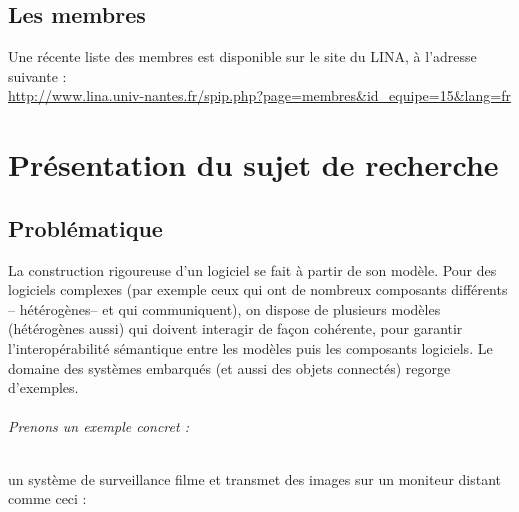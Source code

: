 \documentclass[12pt,a4paper]{report}
\begin{document}
\section{Les membres}
Une récente liste des membres est disponible sur le site du LINA, à l'adresse suivante : \\
\url{http://www.lina.univ-nantes.fr/spip.php?page=membres&id_equipe=15&lang=fr}

\chapter{Présentation du sujet de recherche}
\section{Problématique}

La construction rigoureuse d'un logiciel se fait à partir de son modèle. Pour des 
logiciels complexes (par exemple ceux qui ont de nombreux composants différents -- 
hétérogènes-- et qui communiquent), on dispose de plusieurs modèles (hétérogènes 
aussi) qui doivent interagir de façon cohérente, pour garantir l'interopérabilité 
sémantique entre les modèles puis les composants logiciels. Le domaine des systèmes 
embarqués (et aussi des objets connectés) regorge d'exemples.\\

\subparagraph*{Prenons un exemple concret :\\ }
un système de surveillance filme et transmet des images sur un moniteur distant comme ceci : 
\end{document}
